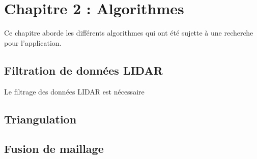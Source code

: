 \chapter{Chapitre 2 : Algorithmes}

Ce chapitre aborde les différents algorithmes qui ont été sujette à une recherche pour l'application.

\section{Filtration de données LIDAR}

Le filtrage des données LIDAR est nécessaire 

\section{Triangulation}
\section{Fusion de maillage}
